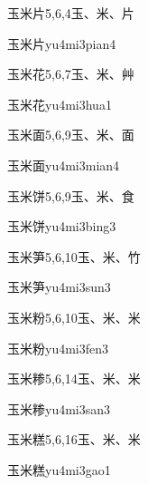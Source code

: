 \begin{entry}{玉米片}{5,6,4}{⽟、⽶、⽚}
  \begin{phonetics}{玉米片}{yu4mi3pian4}
  \end{phonetics}
\end{entry}

\begin{entry}{玉米花}{5,6,7}{⽟、⽶、⾋}
  \begin{phonetics}{玉米花}{yu4mi3hua1}
  \end{phonetics}
\end{entry}

\begin{entry}{玉米面}{5,6,9}{⽟、⽶、⾯}
  \begin{phonetics}{玉米面}{yu4mi3mian4}
  \end{phonetics}
\end{entry}

\begin{entry}{玉米饼}{5,6,9}{⽟、⽶、⾷}
  \begin{phonetics}{玉米饼}{yu4mi3bing3}
  \end{phonetics}
\end{entry}

\begin{entry}{玉米笋}{5,6,10}{⽟、⽶、⽵}
  \begin{phonetics}{玉米笋}{yu4mi3sun3}
  \end{phonetics}
\end{entry}

\begin{entry}{玉米粉}{5,6,10}{⽟、⽶、⽶}
  \begin{phonetics}{玉米粉}{yu4mi3fen3}
  \end{phonetics}
\end{entry}

\begin{entry}{玉米糁}{5,6,14}{⽟、⽶、⽶}
  \begin{phonetics}{玉米糁}{yu4mi3san3}
  \end{phonetics}
\end{entry}

\begin{entry}{玉米糕}{5,6,16}{⽟、⽶、⽶}
  \begin{phonetics}{玉米糕}{yu4mi3gao1}
  \end{phonetics}
\end{entry}


